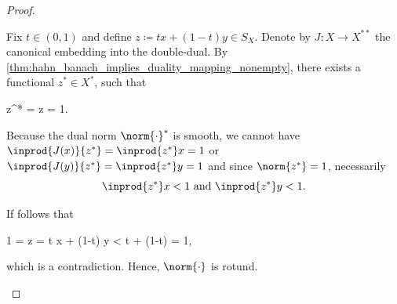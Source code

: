 \begin{proof}
\begin{enumerate}
          Fix \( t \in (0, 1) \) and define \( z \coloneqq tx + (1-t)y \in S_X \). Denote by \( J: X \to X^{**} \) the canonical embedding into the double-dual. By \cref{thm:hahn_banach_implies_duality_mapping_nonempty}, there exists a functional \( z^* \in X^* \), such that
          \begin{balign*}
             {z^*}
            =
             z
            =
            1.
          \end{balign*}

          Because the dual norm \( \norm{\cdot}^* \) is smooth, we cannot have \( \inprod{J(x)} {z^*} =  \inprod{z^*} x = 1 \) or \( \inprod{J(y)} {z^*} = \inprod{z^*} y = 1 \) and since \( \norm{z^*} = 1 \), necessarily
          \begin{equation*}
            \inprod{z^*} x < 1 \text{ and } \inprod{z^*} y < 1.
          \end{equation*}

          If follows that
          \begin{balign*}
            1
            =
             z
            =
            t  x + (1-t)  y
            <
            t + (1-t)
            =
            1,
          \end{balign*}
          which is a contradiction. Hence, \( \norm{\cdot} \) is rotund.
  \end{enumerate}
\end{proof}

